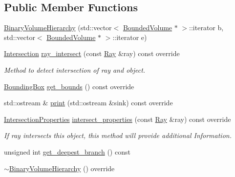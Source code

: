 \subsection*{Public Member Functions}
\begin{DoxyCompactItemize}
\item 
\hyperlink{classBinaryVolumeHierarchy_afb1953933b78a2005884a7a34cb64519}{Binary\+Volume\+Hierarchy} (std\+::vector$<$ \hyperlink{classBoundedVolume}{Bounded\+Volume} $\ast$ $>$\+::iterator b, std\+::vector$<$ \hyperlink{classBoundedVolume}{Bounded\+Volume} $\ast$ $>$\+::iterator e)
\item 
\hyperlink{classIntersection}{Intersection} \hyperlink{classBinaryVolumeHierarchy_aae4af0a21170bb122692314b0fbf399a}{ray\+\_\+intersect} (const \hyperlink{classRay}{Ray} \&ray) const override
\begin{DoxyCompactList}\small\item\em Method to detect intersection of ray and object. \end{DoxyCompactList}\item 
\hyperlink{classBoundingBox}{Bounding\+Box} \hyperlink{classBinaryVolumeHierarchy_aaec23515bc9d81ccc9115489aed8808f}{get\+\_\+bounds} () const override
\item 
std\+::ostream \& \hyperlink{classBinaryVolumeHierarchy_ad92d27372aef59591ddc239685ca770d}{print} (std\+::ostream \&sink) const override
\item 
\hyperlink{classIntersectionProperties}{Intersection\+Properties} \hyperlink{classBinaryVolumeHierarchy_a91c6b8be167dd13ddbb874d4b9f0cedb}{intersect\+\_\+properties} (const \hyperlink{classRay}{Ray} \&ray) const override
\begin{DoxyCompactList}\small\item\em If ray intersects this object, this method will provide additional Information. \end{DoxyCompactList}\item 
unsigned int \hyperlink{classBinaryVolumeHierarchy_a4cf4c6f13a9bd3b852cf40f3ee6889c6}{get\+\_\+deepest\+\_\+branch} () const 
\item 
\hyperlink{classBinaryVolumeHierarchy_a760800685de78279be3619c4ee4170cf}{$\sim$\+Binary\+Volume\+Hierarchy} () override
\end{DoxyCompactItemize}
